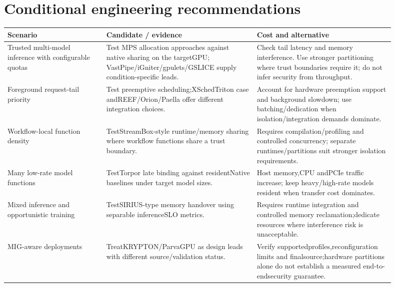 \section{Conditional engineering recommendations}


{\small\begin{longtable}{>{\raggedright\arraybackslash}p{0.23\linewidth}>{\raggedright\arraybackslash}p{0.35\linewidth}>{\raggedright\arraybackslash}p{0.32\linewidth}}
\toprule
Scenario & Candidate /\allowbreak{} evidence & Cost and alternative\\\midrule
\endhead
Trusted multi-model inference with configurable quotas & Test MPS allocation approaches against native sharing on the targetGPU; VastPipe/\allowbreak{}iGniter/\allowbreak{}gpulets/\allowbreak{}GSLICE supply condition-specific leads. & Check tail latency and memory interference. Use stronger partitioning where trust boundaries require it; do not infer security from throughput.\\
Foreground request-tail priority & Test preemptive scheduling;XSchedTriton case andREEF/\allowbreak{}Orion/\allowbreak{}Paella offer different integration choices. & Account for hardware preemption support and background slowdown; use batching/\allowbreak{}dedication when isolation/\allowbreak{}integration demands dominate.\\
Workflow-local function density & TestStreamBox-style runtime/\allowbreak{}memory sharing where workflow functions share a trust boundary. & Requires compilation/\allowbreak{}profiling and controlled concurrency; separate runtimes/\allowbreak{}partitions suit stronger isolation requirements.\\
Many low-rate model functions & TestTorpor late binding against residentNative baselines under target model sizes. & Host memory,CPU andPCIe traffic increase; keep heavy/\allowbreak{}high-rate models resident when transfer cost dominates.\\
Mixed inference and opportunistic training & TestSIRIUS-type memory handover using separable inferenceSLO metrics. & Requires runtime integration and controlled memory reclamation;dedicate resources where interference risk is unacceptable.\\
MIG-aware deployments & TreatKRYPTON/\allowbreak{}ParvaGPU as design leads with different source/\allowbreak{}validation status. & Verify supportedprofiles,reconfiguration limits and finalsource;hardware partitions alone do not establish a measured end-to-endsecurity guarantee.\\
\bottomrule
\end{longtable}}


